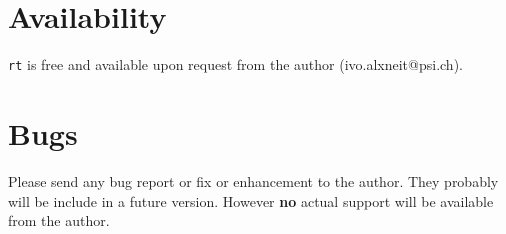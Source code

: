 \documentclass[10pt,a4paper,titlepage]{article}
\newcommand{\rt}{{\tt rt} }
\begin{document}
\section{Availability}
\rt is free and available upon request from the author (ivo.alxneit@psi.ch).



\section{Bugs} Please send any bug report or fix or enhancement to the author. They probably will be include in a future version. However {\bf no} actual support will be available from the author.
\end{document}
